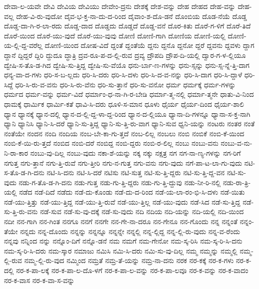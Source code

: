 {ದೇವಾ-ಲ-ಯವೇ
ದೇವಿ
ದೇವಿಯ
ದೇವಿಯು
ದೇವೇಂ-ದ್ರನು
ದೇಶಕ್ಕೆ
ದೇಶ-ವನ್ನು
ದೇಹ
ದೇಹದ
ದೇಹ-ವನ್ನು
ದೇಹ-ವಲ್ಲ
ದೇಹ-ವಿ-ರು-ವುದೋ
ದೈವ-ಭ-ಕ್ತ-ನಾ-ದು-ದ-ರಿಂದ
ದೈವಾಂ-ಶ-ದೊ-ಡನೆ
ದೊಂಬಿಯ
ದೊಡ-ನೆಯೆ
ದೊಡ್ಡ
ದೊಡ್ಡ-ದಾ-ಗಿ-ರ-ಲಾ-ರದು
ದೊಡ್ಡ-ದಾದ
ದೊಡ್ಡದು
ದೊಡ್ಡದೆ
ದೊಡ್ಡ-ವನೆ
ದೊರ-ಕಿತು
ದೊರೆ-ಗ-ಳಿಗೆ
ದೊರೆ-ತಿದೆ
ದೊರೆ-ಯಿಂದ
ದೊರೆ-ಯು-ವುದೆ
ದೊರೆ-ಯು-ವುವು
ದೋಣಿ
ದೋಣಿ-ಗಾಗಿ
ದೋಣಿಯ
ದೋಣಿ-ಯಲ್ಲಿ
ದೋಣಿ-ಯ-ಲ್ಲಿ-ದ್ದ-ವರೆಲ್ಲ
ದೋಣಿ-ಯಿಂದ
ದೋಷ-ವಿದೆ
ದ್ದಂತೆ
ದ್ದಂತೆಯೆ
ದ್ದನು
ದ್ದನೊ
ದ್ದನೋ
ದ್ದರೆ
ದ್ದವನು
ದ್ದವಳು
ದ್ದಾಗ
ದ್ದಾನೆ
ದ್ದಿದ್ದರೆ
ದ್ದಿರಿ
ದ್ದುದೂ
ದ್ಧಾತ್ರಿ
ದ್ರವ-ರೂ-ಪ-ದ-ಲ್ಲಿ-ರುವ
ದ್ರವ್ಯ
ದ್ರೌಪದಿ
ದ್ರೌಪ-ದಿ-ಯಲ್ಲಿ
ದ್ವಾರ-ಗ-ಳ-ಲ್ಲಿಯೂ
ದ್ವೇಷಿ-ಸ-ತೊ-ಡ-ಗಿದ
ದ್ವೇಷಿ-ಸು-ತ್ತಿದ್ದ
ದ್ವೇಷಿ-ಸು-ವೆಯೊ
ಧನು-ರ್ಬಾ-ಣ-ಗಳನ್ನು
ಧನು-ಸ್ಸನ್ನು
ಧನು-ಸ್ಸ-ನ್ನೆ-ತ್ತಿ-ದಾಗ
ಧನ್ಯ-ವಾ-ದ-ಗಳು
ಧರಿ-ಸ-ಬ-ಲ್ಲದು
ಧರಿ-ಸಿ-ದರು
ಧರಿ-ಸಿ-ದಳು
ಧರಿ-ಸಿ-ದ-ವ-ನನ್ನು
ಧರಿ-ಸಿ-ದಾಗ
ಧರಿ-ಸಿ-ದ್ದಾಳೆ
ಧರಿ-ಸಿದ್ದೆ
ಧರಿ-ಸಿ-ರು-ವ-ವನು
ಧರಿ-ಸಿ-ರು-ವೆನು
ಧರಿ-ಸು-ತ್ತಾನೆ
ಧರಿ-ಸು-ವನೋ
ಧರ್ಮ
ಧರ್ಮಕ್ಕೆ
ಧರ್ಮ-ಗಳನ್ನು
ಧರ್ಮದ
ಧರ್ಮ-ವನ್ನು
ಧರ್ಮ-ವಿದೆ
ಧರ್ಮಾಂ-ಧ-ನಾ-ಗಿ-ರ-ಬೇಡಿ
ಧರ್ಮಾ-ತ್ಮ-ನಲ್ಲಿ
ಧರ್ಮಾ-ತ್ಮನೇ
ಧಾತು-ವಿ-ನಿಂದ
ಧಾಮಕ್ಕೆ
ಧಾರ್ಮಿಕ
ಧಾರ್ಮಿ-ಕತೆ
ಧಾವಿ-ಸಿ-ದರು
ಧೂಳಿ-ಸ-ಮಾನ
ಧೂಳು
ಧೈರ್ಯ
ಧೈರ್ಯ-ದಿಂದ
ಧೈರ್ಯ-ಶಾಲಿ
ಧ್ಯಾನ
ಧ್ಯಾನಕ್ಕೆ
ಧ್ಯಾನ-ದಲ್ಲಿ
ಧ್ಯಾನ-ದ-ಲ್ಲಿ-ದ್ದ-ಳಾ-ದ್ದ-ರಿಂದ
ಧ್ಯಾನ-ದ-ಲ್ಲಿಯೂ
ಧ್ಯಾನಾ-ದಿ-ಗಳನ್ನೂ
ಧ್ಯಾನಾ-ಸ-ಕ್ತ-ನಾಗಿ
ಧ್ಯಾನಿ
ಧ್ಯಾನಿಸಿ
ಧ್ಯಾನಿ-ಸಿ-ದರೆ
ಧ್ಯಾನಿ-ಸು-ತ್ತಿದ್ದ
ಧ್ಯಾನಿ-ಸು-ತ್ತಿ-ರು-ವಾಗ
ಧ್ಯಾನಿ-ಸುವ
ಧ್ವನಿ-ಯನ್ನು
ನಂಟರು
ನಂತರ
ನಂತೆ
ನಂತೆಯೇ
ನಂದನ
ನಂದಿ
ನಂದಿಯ
ನಂಬ-ಬೇ-ಕಾ-ಗು-ತ್ತದೆ
ನಂಬ-ಲಿಲ್ಲ
ನಂಬಲು
ನಂಬಿ
ನಂಬಿಕೆ
ನಂಬಿ-ಕೆ-ಯಿಂದ
ನಂಬಿ-ಕೆ-ಯಿ-ರು-ತ್ತದೆ
ನಂಬಿದ
ನಂಬಿ-ದರೆ
ನಂಬಿದ್ದ
ನಂಬಿ-ದ್ದರು
ನಂಬಿ-ರ-ಲಿಲ್ಲ
ನಂಬು
ನಂಬು-ವನು
ನಂಬು-ವ-ನು-ನಿ-ರಾ-ಕಾರ
ನಂಬು-ವು-ದಿಲ್ಲ
ನಂಬು-ವುದು
ನಕಾ-ಶೆ-ಯನ್ನು
ನಕ್ಕ
ನಕ್ಕು
ನಕ್ಷತ್ರ
ನಗ
ನಗ-ನಾ-ಣ್ಯ-ಗಳನ್ನು
ನಗ-ರಿಗೆ
ನಗುತ್ತ
ನಗು-ತ್ತಾನೆ
ನಗು-ತ್ತಿ-ರುವೆ
ನಗು-ತ್ತೀರಿ
ನಗು-ನ-ಗುತ್ತ
ನಗು-ವನು
ನಗು-ವುದು
ನಗೆ-ಪಾ-ಟ-ಲಾ-ಗು-ವುದು
ನಟಿ-ಸ-ತೊ-ಡ-ಗಿ-ದನು
ನಟಿ-ಸಿ-ದನು
ನಟಿ-ಸಿ-ದರೆ
ನಟಿಸು
ನಟಿ-ಸುತ್ತ
ನಟಿ-ಸು-ತ್ತಿ-ದ್ದರು
ನಟಿ-ಸು-ತ್ತಿ-ದ್ದ-ವನ
ನಟಿ-ಸು-ವುದು
ನಡು-ಗ-ತೊ-ಡ-ಗಿ-ದನು
ನಡು-ಗುತ್ತ
ನಡು-ಗು-ತ್ತಿ-ದ್ದರು
ನಡು-ಗು-ತ್ತಿ-ದ್ದುವು
ನಡು-ನೀ-ರಿ-ನಲ್ಲಿ
ನಡು-ರಾ-ತ್ರಿ-ಯಲ್ಲಿ
ನಡೆದ
ನಡೆ-ದಿದೆ
ನಡೆದು
ನಡೆ-ದು-ಕೊಂಡು
ನಡೆ-ದು-ದ-ರಿಂದ
ನಡೆ-ಯ-ಲಾ-ರಂ-ಭಿ-ಸಿ-ದಳು
ನಡೆ-ಯಿತು
ನಡೆ-ಯು-ತ್ತಿತ್ತು
ನಡೆ-ಯು-ತ್ತಿದ್ದ
ನಡೆ-ಯು-ತ್ತಿ-ರುವೆ
ನಡೆ-ಯು-ತ್ತಿಲ್ಲ
ನಡೆ-ಯು-ವುದು
ನಡೆ-ಸಿದ
ನಡೆ-ಸು-ತ್ತಿದ್ದ
ನಡೆ-ಸು-ತ್ತಿ-ರು-ವನು
ನಡೆ-ಸುವ
ನಡೆ-ಸು-ವು-ದಕ್ಕೆ
ನಡೆ-ಸು-ವುದು
ನದಿ
ನದಿಯ
ನದಿ-ಯನ್ನು
ನದಿ-ಯಲ್ಲಿ
ನದಿ-ಯಿಂದ
ನದೀ
ನನ-ಗಾಗಿ
ನನ-ಗಿಂತ
ನನಗೂ
ನನಗೆ
ನನಗೇ
ನನ-ಗೇ-ನಾ-ದರೂ
ನನ-ಗೇನೂ
ನನ-ಗೊಂದು
ನನ್ನ
ನನ್ನಂತೆ
ನನ್ನಂ-ತೆಯೇ
ನನ್ನದು
ನನ್ನ-ದೊಂದು
ನನ್ನನ್ನು
ನನ್ನನ್ನೂ
ನನ್ನನ್ನೇ
ನನ್ನಲ್ಲಿ
ನನ್ನ-ಲ್ಲಿದ್ದ
ನನ್ನ-ಲ್ಲಿ-ರು-ವುದು
ನನ್ನ-ವ-ರೆಂದು
ನನ್ನವು
ನನ್ನಿಂದ
ನನ್ನು
ನನ್ನೊಂ-ದಿಗೆ
ನನ್ನೊ-ಡನೆ
ನಮ
ನಮಗೆ
ನಮ-ಗೇನೋ
ನಮ-ಸ್ಕ-ರಿಸಿ
ನಮ-ಸ್ಕ-ರಿ-ಸಿ-ದನು
ನಮ-ಸ್ಕ-ರಿ-ಸಿ-ದರು
ನಮ-ಸ್ಕಾರ
ನಮಾಜು
ನಮಿಸಿ
ನಮಿ-ಸಿ-ದರು
ನಮಿ-ಸು-ವು-ದಿಲ್ಲ
ನಮ್ಮ
ನಮ್ಮನ್ನು
ನಮ್ಮಲ್ಲಿ
ನಮ್ಮ-ಲ್ಲಿ-ರುವ
ನಮ್ಮ-ಲ್ಲಿ-ರು-ವುದ
ನಮ್ಮಿಂದ
ನಮ್ರತೆ
ನಮ್ರ-ತೆ-ಯನ್ನು
ನಮ್ರ-ನಾ-ದನು
ನರಕ
ನರ-ಕಕ್ಕೆ
ನರ-ಕ-ಗಳು
ನರ-ಕ-ದಲ್ಲಿ
ನರ-ಕ-ಪಾ-ಲಕ್ಕೆ
ನರ-ಕ-ಪಾ-ಲ-ದೊ-ಳಗೆ
ನರ-ಕ-ಪಾ-ಲ-ವನ್ನು
ನರ-ಕ-ಪಾ-ಲವೂ
ನರ-ಕ-ವನ್ನು
ನರ-ಕ-ವಾದಂ
ನರ-ಕ-ವಾಸ
ನರ-ಕ-ವಾ-ಸ-ವನ್ನು
}
